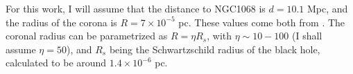 For this work, I will assume that the distance to NGC1068 is $d = 10.1$ Mpc, and the radius of the corona is $R = 7 \times 10^{-5}$ pc. These values come both from \citet{padovani2024highenergyneutrinosvicinitysupermassive}. The coronal radius can be parametrized as $R = \eta R_s$, with $\eta \sim 10 - 100$ (I shall assume $\eta = 50$), and $R_s$ being the Schwartzschild radius of the black hole, calculated to be around $1.4 \times 10^{-6}$ pc.








